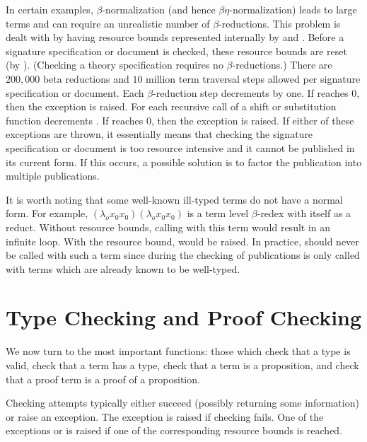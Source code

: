 In certain examples, $\beta$-normalization (and hence $\beta\eta$-normalization)
leads to large terms and can require
an unrealistic number of $\beta$-reductions.
This problem is dealt with by having resource bounds
represented internally by {}
and {}.
Before a signature specification or document is checked,
these resource bounds are reset (by {}).
(Checking a theory specification requires no $\beta$-reductions.)
There are $200,000$ beta reductions and $10$ million term traversal steps
allowed per signature specification or document.
Each $\beta$-reduction step decrements {} by one.
If {} reaches $0$, then the exception {} is raised.
For each recursive call of a shift or substitution function
decrements {}.
If {} reaches $0$, then the exception {} is raised.
If either of these exceptions are thrown, it essentially means that checking
the signature specification or document is too resource intensive and
it cannot be published in its current form.
If this occurs, a possible solution is to factor the publication into multiple publications.

It is worth noting that some well-known ill-typed terms do not have a normal form.
For example, $(\lambda_o x_0 x_0) (\lambda_o x_0 x_0)$ is a term level $\beta$-redex
with itself as a reduct. Without resource bounds, calling {}
with this term would result in an infinite loop. With the resource bound, {}
would be raised.
In practice, {} should never be called with such a term
since during the checking of publications {} is only
called with terms which are already known to be well-typed.

\section{Type Checking and Proof Checking}

We now turn to the most important functions: those which check that a type
is valid, check that a term has a type, check that a term is a proposition,
and check that a proof term is a proof of a proposition.

Checking attempts typically either succeed
(possibly returning some information)
or raise an exception.
The exception {} is raised
if checking fails.
One of the exceptions {} or {} is raised
if one of the corresponding resource bounds is reached.


